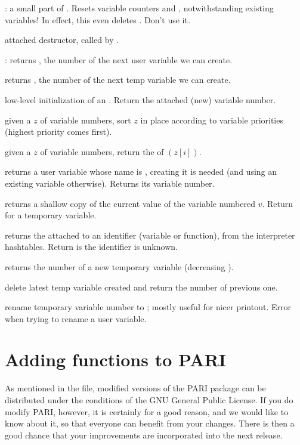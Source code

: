 
: a small part of . Resets
variable counters  and , notwithstanding existing
variables! In effect, this even deletes . Don't use it.

 attached destructor, called by
.

: returns , the number of the next user
variable we can create.

 returns , the number of the
next temp variable we can create.

 low-level initialization of an
. Return the attached (new) variable number.

 given a  $z$ of variable
numbers, sort $z$ in place according to variable priorities (highest priority
comes first).

 given a  $z$ of variable numbers,
return the  of $(z[i])$.


 returns a user variable whose name
is , creating it is needed (and using an existing variable otherwise).
Returns its variable number.

 returns a shallow copy of the
current value of the variable numbered $v$. Return  for a temporary
variable.

 returns the  attached
to an identifier  (variable or function), from the interpreter
hashtables. Return  is the identifier is unknown.


 returns the number of a new temporary variable
(decreasing ).

 delete latest temp variable created and return
the number of previous one.

 rename temporary variable number
 to ; mostly useful for nicer printout. Error when trying to
rename a user variable.

\section{Adding functions to PARI}
%
As mentioned in the  file, modified versions of the PARI package
can be distributed under the conditions of the GNU General Public License. If
you do modify PARI, however, it is certainly for a good reason, and we
would like to know about it, so that everyone can benefit from your changes.
There is then a good chance that your improvements are incorporated into the
next release.

